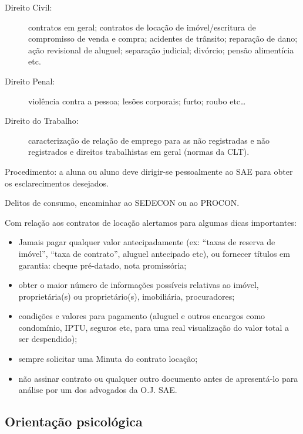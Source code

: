 \begin{description}
\item[Direito Civil:] contratos em geral; contratos de locação de
  imóvel/escritura de compromisso de venda e compra; acidentes de trânsito;
  reparação de dano; ação revisional de aluguel; separação judicial; divórcio;
  pensão alimentícia etc.

\item[Direito Penal:] violência contra a pessoa; lesões corporais; furto; roubo
  etc{\dots}

\item[Direito do Trabalho:] caracterização de relação de emprego para as não
  registradas e não registrados e direitos trabalhistas em geral (normas da
  CLT).
\end{description}

Procedimento: a aluna ou aluno deve dirigir-se pessoalmente ao SAE para obter
os esclarecimentos desejados.

Delitos de consumo, encaminhar ao SEDECON ou ao PROCON.

Com relação aos contratos de locação alertamos para algumas dicas importantes:

\begin{itemize}
\item Jamais pagar qualquer valor antecipadamente (ex: ``taxas de reserva de
  imóvel'', ``taxa de contrato'', aluguel antecipado etc), ou fornecer títulos
  em garantia: cheque pré-datado, nota promissória;

\item obter o maior número de informações possíveis relativas ao imóvel,
  proprietária(s) ou proprietário(s), imobiliária, procuradores;

\item condições e valores para pagamento (aluguel e outros encargos como
  condomínio, IPTU, seguros etc, para uma real visualização do valor total a
  ser despendido);

\item sempre solicitar uma Minuta do contrato locação;

\item não assinar contrato ou qualquer outro documen\-to antes de apresentá-lo
  para análise por um dos advogados da O.J. SAE.
\end{itemize}

\subsection{Orientação psicológica}

